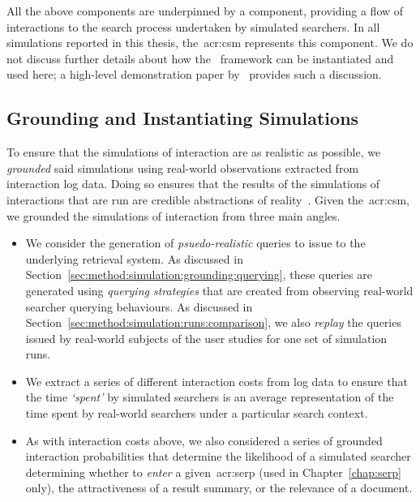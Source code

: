 All the above components are underpinned by a  component, providing a flow of interactions to the search process undertaken by simulated searchers. In all simulations reported in this thesis, the~\gls{acr:csm} represents this component. We do not discuss further details about how the \simiir~framework can be instantiated and used here; a high-level demonstration paper by~\cite{maxwell2016simiir} provides such a discussion.

\subsection{Grounding and Instantiating Simulations}\label{sec:method:simulation:grounding}
To ensure that the simulations of interaction are as realistic as possible, we \emph{grounded} said simulations using real-world observations extracted from interaction log data. Doing so ensures that the results of the simulations of interactions that are run are credible abstractions of reality~\citep{azzopardi2010workshop}. Given the~\gls{acr:csm}, we grounded the simulations of interaction from three main angles.

\begin{itemize}
    \item{ We consider the generation of \emph{psuedo-realistic} queries to issue to the underlying retrieval system. As discussed in Section~\ref{sec:method:simulation:grounding:querying}, these queries are generated using \emph{querying strategies} that are created from observing real-world searcher querying behaviours. As discussed in Section~\ref{sec:method:simulation:runs:comparison}, we also \emph{replay} the queries issued by real-world subjects of the user studies for one set of simulation runs.}
    \item{ We extract a series of different interaction costs from log data to ensure that the time \emph{`spent'} by simulated searchers is an average representation of the time spent by real-world searchers under a particular search context.}
    \item{ As with interaction costs above, we also considered a series of grounded interaction probabilities that determine the likelihood of a simulated searcher determining whether to \emph{enter} a given~\gls{acr:serp} (used in Chapter~\ref{chap:serp} only), the attractiveness of a result summary, or the relevance of a document.}
\end{itemize}


